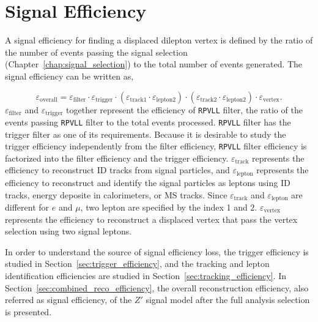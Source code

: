 \chapter{Signal Efficiency}
\label{chap:eff}

A signal efficiency for finding a displaced dilepton vertex is defined by the ratio of the number of events passing the signal selection (Chapter~\ref{chap:signal_selection}) to the total number of events generated. The signal efficiency can be written as,

\begin{equation}
\label{eq:OverallEff}
\varepsilon_{\mathrm{overall}} = \varepsilon_{\mathrm{filter}} \cdot \varepsilon_{\mathrm{trigger}} \cdot 
                     (\varepsilon_{\mathrm{track1}} \cdot \varepsilon_{\mathrm{lepton2}}) \cdot
                     (\varepsilon_{\mathrm{track2}} \cdot \varepsilon_{\mathrm{lepton2}}) \cdot
                     \varepsilon_{\mathrm{vertex}}.
\end{equation}
%
$\varepsilon_{\mathrm{filter}}$ and $\varepsilon_{\mathrm{trigger}}$ together represent the efficiency of \texttt{RPVLL} filter, the ratio of the events passing \texttt{RPVLL} filter to the total events processed. \texttt{RPVLL} filter has the trigger filter as one of its requirements. Because it is desirable to study the trigger efficiency independently from the filter efficiency, \texttt{RPVLL} filter efficiency is factorized into the filter efficiency and the trigger efficiency. $\varepsilon_{\mathrm{track}}$ represents the efficiency to reconstruct ID tracks from signal particles, and $\varepsilon_{\mathrm{lepton}}$ represents the efficiency to reconstruct and identify the signal particles as leptons using ID tracks, energy deposite in calorimeters, or MS tracks. Since $\varepsilon_{\mathrm{track}}$ and $\varepsilon_{\mathrm{lepton}}$ are different for $e$ and $\mu$, two lepton are specified by the index 1 and 2. $\varepsilon_{\mathrm{vertex}}$ represents the efficiency to reconstruct a displaced vertex that pass the vertex selection using two signal leptons.

In order to understand the source of signal efficiency loss, the trigger efficiency is studied in Section~\ref{sec:trigger_efficiency}, and the tracking and lepton identification efficiencies are studied in Section~\ref{sec:tracking_efficiency}. In Section~\ref{sec:combined_reco_efficiency}, the overall reconstruction efficiency, also referred as signal efficiency, of the $Z'$ signal model after the full analysis selection is presented. 

